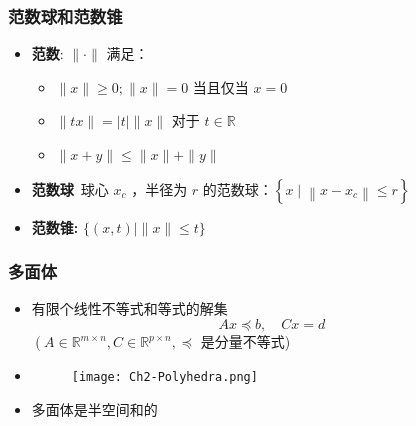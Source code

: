 \documentclass[handout]{beamer}
\begin{document}
\begin{frame}
	\frametitle{范数球和范数锥}

\begin{itemize}%
  \item<1->
  \textbf{范数}:   $\|\cdot\|$ 满足：
	\begin{itemize}
		\item $\|x\| \geq 0 ;\|x\|=0$ 当且仅当 $x=0$
		\item $\|t x\|=|t|\|x\|$ 对于 $t \in \mathbb{R}$
		\item $\|x+y\| \leq\|x\|+\|y\|$
	\end{itemize}


\item<2-> \textbf{范数球}\ 球心 $x_{c}$ ，半径为 $r$ 的范数球：$\left\{x \mid\left\|x-x_{c}\right\| \leq r\right\}$

\item<3->
	\textbf{范数锥:} $\{(x, t) \mid\|x\| \leq t\}$
	
 

\end{itemize}
\end{frame}
\begin{frame}
	\frametitle{多面体}

\begin{itemize}[<+->]
  \item
	有限个线性不等式和等式的解集
\begin{equation}
	A x \preceq b, \quad C x=d
\end{equation}
$\left(A \in \mathbb{R}^{m \times n}, C \in\mathbb{R}^{p \times n}, \preceq\right.$ 是分量不等式)

\item[] \begin{figure}[htbp]
\centering
\texttt{[image: Ch2-Polyhedra.png]}
\end{figure}

\item
多面体是半空间和的
\end{itemize}
\end{frame}
\end{document}
